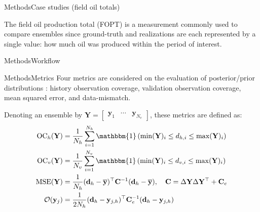 \begin{frame}{Methods}{Case studies (field oil totals)}
    \begin{minipage}{.425\linewidth}
        The field oil production total (FOPT) 
        is a measurement commonly used to compare ensembles since ground-truth and realizations are each represented by a single value:
        how much oil was produced within the period of interest.
    \end{minipage}
    \begin{minipage}{.55\linewidth}
        \flushright
        \vspace{0.75cm}
        \scalebox{0.875}{}
    \end{minipage}
\end{frame} 

\begin{frame}{Methods}{Workflow}
    \scalebox{0.95}{%
        
    }
\end{frame}

\begin{frame}{Methods}{Metrics}
    Four metrics are considered on the evaluation of posterior/prior distributions
    \cite[subsection 9.4.2]{Emerick:2025}:
        history observation coverage,
        validation observation coverage,
        mean squared error, 
        and data-mismatch.

        \medskip

        Denoting an ensemble by 
        $\mathbf{Y} = 
        \begin{bmatrix}
            \mathbf{y}_1 & \cdots & \mathbf{y}_{N_e}
        \end{bmatrix}$, 
        these metrics are defined as:
    \begin{align}
        \text{OC}_h(\mathbf{Y}) &= \frac{1}{N_h} \sum_{i=1}^{N_h} 
        \mathbbm{1}\left(
            \min(\mathbf{Y})_i \leq d_{h, i} \leq \max(\mathbf{Y})_i
        \right)\\
        \text{OC}_v(\mathbf{Y}) &= \frac{1}{N_v} \sum_{i=1}^{N_v} 
        \mathbbm{1}\left(
            \min(\mathbf{Y})_i \leq d_{v, i} \leq \max(\mathbf{Y})_i
        \right)\\
        \text{MSE}(\mathbf{Y}) &= 
        \frac{1}{N_h} 
        (\mathbf{d}_h - \overline{\mathbf{y}})^\top \mathbf{C}^{-1} 
        (\mathbf{d}_h - \overline{\mathbf{y}}),
        \quad 
        \mathbf{C} = \Delta\mathbf{Y}\Delta\mathbf{Y}^\top + \mathbf{C}_e \\
        \mathcal{O}(\mathbf{y}_j) &= 
        \frac{1}{2N_h}
        (\mathbf{d}_h - \mathbf{y}_{j, h})^\top
        \mathbf{C}_e^{-1}
        (\mathbf{d}_h - \mathbf{y}_{j, h})
    \end{align}
\end{frame}

